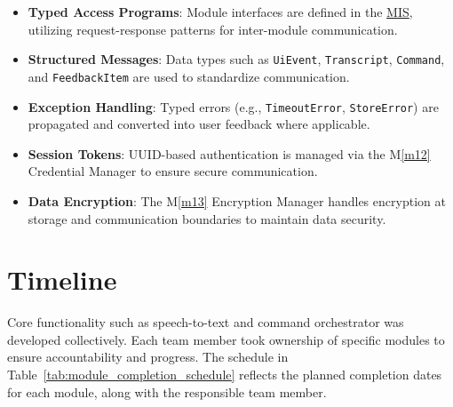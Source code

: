 \documentclass[12pt, titlepage]{article}
\newcommand{\mref}[1]{M\ref{#1}}
\begin{document}
\begin{itemize}
\item \textbf{Typed Access Programs}: Module interfaces are defined in the \href{https://github.com/speech-buddies/VoiceBridge/blob/main/docs/Design/SoftDetailedDes/MIS.pdf}{MIS}, utilizing request-response patterns for inter-module communication.
\item \textbf{Structured Messages}: Data types such as \texttt{UiEvent}, \texttt{Transcript}, \texttt{Command}, and \texttt{FeedbackItem} are used to standardize communication.
\item \textbf{Exception Handling}: Typed errors (e.g., \texttt{TimeoutError}, \texttt{StoreError}) are propagated and converted into user feedback where applicable.
\item \textbf{Session Tokens}: UUID-based authentication is managed via the \mref{m12} Credential Manager to ensure secure communication.
\item \textbf{Data Encryption}: The \mref{m13} Encryption Manager handles encryption at storage and communication boundaries to maintain data security.
\end{itemize}

\section{Timeline}

Core functionality such as speech-to-text and command orchestrator was developed collectively.  Each team member took ownership of specific modules to ensure accountability and progress. The schedule in Table~\ref{tab:module_completion_schedule} reflects the planned completion dates for each module, along with the responsible team member.
\end{document}
